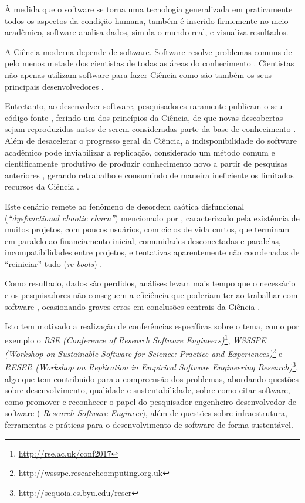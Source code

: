 {À medida que o software se torna uma tecnologia generalizada em praticamente
todos os aspectos da condição humana, também é inserido firmemente no meio
acadêmico, software analisa dados, simula o mundo real, e visualiza
resultados.}
\label{introducao}

A Ciência moderna depende de software. Software resolve problemas comuns de
pelo menos metade dos cientistas de todas as áreas do conhecimento
\cite{wilson2014best}. Cientistas não apenas utilizam software para fazer Ciência como são também
os seus principais desenvolvedores
\cite{goble2014better}.

Entretanto, ao desenvolver software, pesquisadores raramente publicam o
seu código fonte \cite{robles2010replicating, amann2015software}, ferindo um dos
princípios da Ciência, de que novas descobertas sejam reproduzidas antes de
serem consideradas parte da base de conhecimento \cite{stodden2009enabling}.
%
Além de desacelerar o progresso geral da Ciência, a indisponibilidade 
do software acadêmico pode inviabilizar a replicação, considerado
um  método comum e cientificamente produtivo de produzir
conhecimento novo a partir de pesquisas anteriores
\cite{king1995replication, stodden2010reproducible}, 
gerando retrabalho e consumindo de maneira ineficiente os limitados recursos da Ciência
\cite{howison2013incentives, katz2014transitive}.

Este cenário remete ao fenômeno de desordem caótica disfuncional ({\it ``dysfunctional
chaotic churn''}) mencionado por , 
caracterizado pela existência de muitos projetos, com poucos
usuários, com ciclos de vida curtos, que terminam em paralelo ao financiamento
inicial, comunidades desconectadas e paralelas, incompatibilidades entre
projetos, e tentativas aparentemente não coordenadas de ``reiniciar'' tudo
({\it re-boots}) \cite{howison2015understanding}.

Como resultado, dados são perdidos,
análises levam mais tempo que o necessário e os pesquisadores não conseguem a
eficiência que poderiam ter ao trabalhar com software
\cite{wilson2017good},
ocasionando graves erros em conclusões centrais da Ciência \cite{merali2010computational}.

Isto tem motivado a realização de conferências específicas sobre o tema,
como por exemplo o {\it RSE (Conference of Research
Software Engineers)}\footnote{ \url{http://rse.ac.uk/conf2017}}, {\it WSSSPE
(Workshop on Sustainable Software for Science: Practice and
Experiences)}\footnote{ \url{http://wssspe.researchcomputing.org.uk}} e {\it
RESER (Workshop on Replication in Empirical Software Engineering
Research)}\footnote{ \url{http://sequoia.cs.byu.edu/reser}}, algo que tem contribuido para
a compreensão dos problemas, abordando questões sobre desenvolvimento,
qualidade e sustentabilidade, sobre como citar software, como promover e
reconhecer o papel do pesquisador engenheiro desenvolvedor de software ({\it
Research Software Engineer}), além de questões sobre infraestrutura,
ferramentas e práticas para o desenvolvimento de software de forma sustentável.

